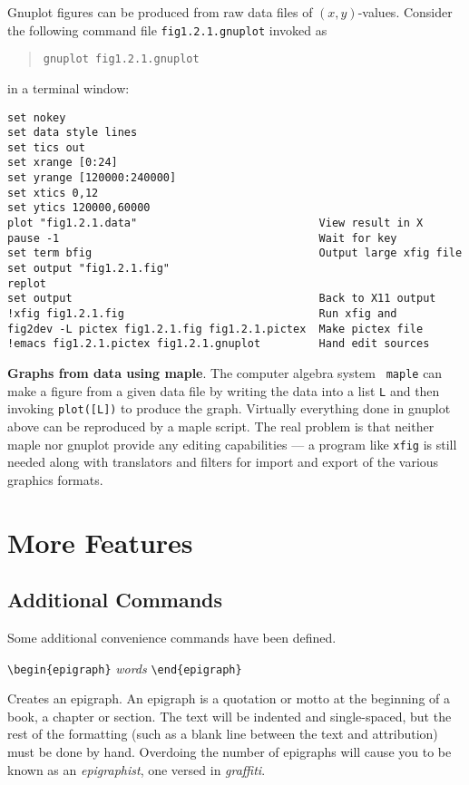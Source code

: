 Gnuplot figures can be produced from raw data files of
$(x,y)$-values. Consider the following command file
\verb"fig1.2.1.gnuplot" invoked as
\begin{quote}
 \verb"gnuplot fig1.2.1.gnuplot"
\end{quote}
in a terminal window:
\begin{verbatim}
set nokey
set data style lines
set tics out
set xrange [0:24]
set yrange [120000:240000]
set xtics 0,12
set ytics 120000,60000
plot "fig1.2.1.data"                            View result in X
pause -1                                        Wait for key
set term bfig                                   Output large xfig file
set output "fig1.2.1.fig"
replot
set output                                      Back to X11 output
!xfig fig1.2.1.fig                              Run xfig and
fig2dev -L pictex fig1.2.1.fig fig1.2.1.pictex  Make pictex file
!emacs fig1.2.1.pictex fig1.2.1.gnuplot         Hand edit sources
\end{verbatim}

{\bf Graphs from data using maple}. The computer algebra system {\tt
maple} can make a figure from a given data file by writing the data into
a list {\tt L} and then invoking {\tt plot([L])} to produce the graph.
Virtually everything done in gnuplot above can be reproduced by a maple
script. The real problem is that neither maple nor gnuplot provide any
editing capabilities --- a program like {\tt xfig} is still needed along
with translators and filters for import and export of the various
graphics formats.

\section{More Features}

\subsection{Additional Commands}

Some additional convenience commands have been defined.

\verb|\begin{epigraph}| {\em words} \verb|\end{epigraph}|

\noindent Creates an epigraph.
An epigraph is a quotation or motto at the beginning of a book, a
chapter or section. The text will be indented and single-spaced, but the
rest of the formatting (such as a blank line between the text and
attribution) must be done by hand. Overdoing the number of epigraphs
will cause you to be known as an {\em epigraphist}, one versed in {\em
graffiti}.

